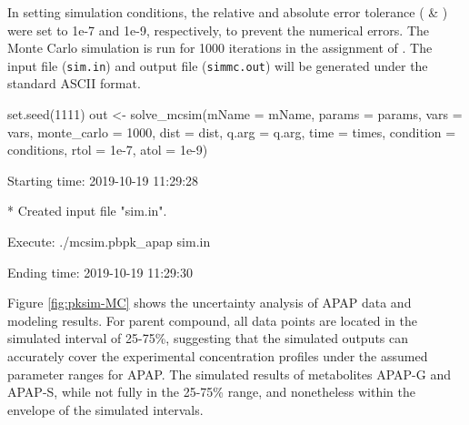 In setting simulation conditions, the relative and absolute error
tolerance ( \& ) were set to 1e-7 and 1e-9,
respectively, to prevent the numerical errors. The Monte Carlo
simulation is run for 1000 iterations in the assignment of
. The input file (\texttt{sim.in}) and output file
(\texttt{simmc.out}) will be generated under the standard ASCII format.

\begin{Schunk}
\begin{Sinput}
set.seed(1111)
out <- solve_mcsim(mName = mName, params = params, vars = vars,
                   monte_carlo = 1000, dist = dist, q.arg = q.arg, 
                   time = times, condition = conditions, 
                   rtol = 1e-7, atol = 1e-9)
\end{Sinput}
\begin{Soutput}
  Starting time: 2019-10-19 11:29:28
\end{Soutput}
\begin{Soutput}
  * Created input file "sim.in".
\end{Soutput}
\begin{Soutput}
  Execute: ./mcsim.pbpk_apap sim.in
\end{Soutput}
\begin{Soutput}
  Ending time: 2019-10-19 11:29:30
\end{Soutput}
\end{Schunk}

Figure \ref{fig:pksim-MC} shows the uncertainty analysis of APAP data
and modeling results. For parent compound, all data points are located
in the simulated interval of 25-75\%, suggesting that the simulated
outputs can accurately cover the experimental concentration profiles
under the assumed parameter ranges for APAP. The simulated results of
metabolites APAP-G and APAP-S, while not fully in the 25-75\% range, and
nonetheless within the envelope of the simulated intervals.

